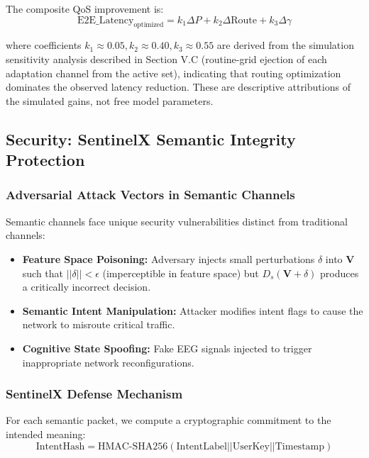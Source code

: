 \documentclass[journal]{IEEEtran}
\begin{document}
The composite QoS improvement is:
\begin{equation}
    \text{E2E\_Latency}_{\text{optimized}} = k_1 \Delta P + k_2 \Delta \text{Route} + k_3 \Delta\gamma
\end{equation}

where coefficients $k_1 \approx 0.05, k_2 \approx 0.40, k_3 \approx 0.55$ are derived from the simulation sensitivity analysis described in Section V.C (routine-grid ejection of each adaptation channel from the active set), indicating that routing optimization dominates the observed latency reduction. These are descriptive attributions of the simulated gains, not free model parameters.

\subsection{Security: SentinelX Semantic Integrity Protection}

\subsubsection{Adversarial Attack Vectors in Semantic Channels}
Semantic channels face unique security vulnerabilities distinct from traditional channels:
\begin{itemize}
    \item \textbf{Feature Space Poisoning:} Adversary injects small perturbations $\delta$ into $\mathbf{V}$ such that $||\delta|| < \epsilon$ (imperceptible in feature space) but $D_s(\mathbf{V} + \delta)$ produces a critically incorrect decision.
    \item \textbf{Semantic Intent Manipulation:} Attacker modifies intent flags to cause the network to misroute critical traffic.
    \item \textbf{Cognitive State Spoofing:} Fake EEG signals injected to trigger inappropriate network reconfigurations.
\end{itemize}

\subsubsection{SentinelX Defense Mechanism}
For each semantic packet, we compute a cryptographic commitment to the intended meaning:
\begin{equation}
    \text{IntentHash} = \text{HMAC-SHA256}(\text{IntentLabel} || \text{UserKey} || \text{Timestamp})
\end{equation}
\end{document}
